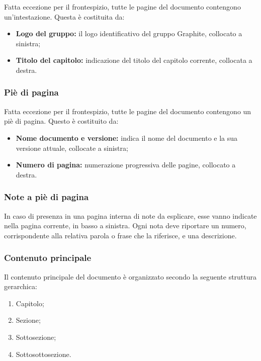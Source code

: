 \documentclass[../NormediProgetto.tex]{subfiles}
\begin{document}
Fatta eccezione per il frontespizio, tutte le pagine del documento contengono un’intestazione. Questa è costituita da: 

\begin{itemize}
	\item \textbf{Logo del gruppo:} il logo identificativo del gruppo Graphite, collocato a sinistra;
	\item \textbf{Titolo del capitolo:} indicazione del titolo del capitolo corrente, collocata a destra.
\end{itemize}

\subsubsection{Piè di pagina}

Fatta eccezione per il frontespizio, tutte le pagine del documento contengono un piè di pagina. Questo è costituito da: 

\begin{itemize}
	\item \textbf{Nome documento e versione:} indica il nome del documento e la sua versione attuale, collocate a sinistra;
	\item \textbf{Numero di pagina:} numerazione progressiva delle pagine, collocato a destra.
\end{itemize}

\subsubsection{Note a piè di pagina}

In caso di presenza in una pagina interna di note da esplicare, esse vanno indicate nella pagina corrente, in basso a sinistra. Ogni nota deve riportare un numero, corrispondente alla relativa parola o frase che la riferisce, e una descrizione.

\subsubsection{Contenuto principale}

Il contenuto principale del documento è organizzato secondo la seguente struttura gerarchica:

\begin{enumerate}
	\item Capitolo;
	\item Sezione;
	\item Sottosezione;
	\item Sottosottosezione.
\end{enumerate}
\end{document}

